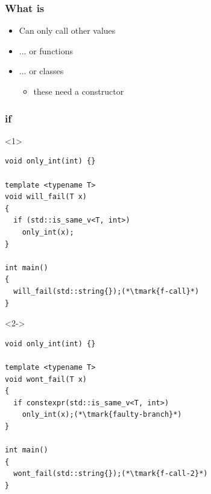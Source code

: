 \documentclass[14pt]{beamer}
\begin{document}
\begin{frame}
  \frametitle{What is }

  \begin{itemize} \setlength\itemsep{.5em}
    \item Can only call other  values
    \item ... or  functions
    \item ... or  classes
    \begin{itemize}
      \item these need a  constructor
    \end{itemize}
  \end{itemize}

\end{frame}

\begin{frame}[fragile]
  \frametitle{ if}
  
  \begin{onlyenv}<1>
  \begin{lstlisting}[basicstyle=\codefontsize{12pt}]
void only_int(int) {}

template <typename T>
void will_fail(T x)
{
  if (std::is_same_v<T, int>)
    only_int(x);
}

int main()
{
  will_fail(std::string{});(*\tmark{f-call}*)
}
  \end{lstlisting}

  \end{onlyenv}

  \begin{onlyenv}<2->
  \begin{lstlisting}[basicstyle=\codefontsize{12pt}]
void only_int(int) {}

template <typename T>
void wont_fail(T x)
{
  if constexpr(std::is_same_v<T, int>)
    only_int(x);(*\tmark{faulty-branch}*)
}

int main()
{
  wont_fail(std::string{});(*\tmark{f-call-2}*)
}
  \end{lstlisting}
  \end{onlyenv}

  \nointerlineskip

\end{frame}
\end{document}
